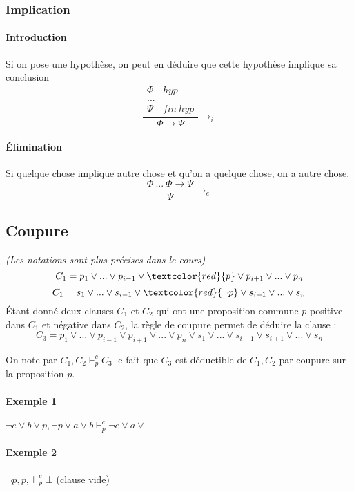 \documentclass[a4paper]{article}
\begin{document}
  \subsubsection{Implication}
  \paragraph{Introduction} Si on pose une hypothèse, on peut en déduire que cette
  hypothèse implique sa conclusion
  $$ \frac{\begin{matrix} \Phi & hyp\\
     ... & \\
     \Psi & fin~hyp\end{matrix}}{\Phi \rightarrow \Psi}\rightarrow_{i} $$

  \paragraph{\'Elimination} Si quelque chose implique autre chose et qu'on a
  quelque chose, on a autre chose.
  $$ \frac{\Phi ~...~ \Phi \rightarrow \Psi}{\Psi}\rightarrow_{e} $$

  \subsection{Coupure}
  \textit{(Les notations sont plus précises dans le cours)}\\
  $$ C_1 = p_1 \lor ... \lor p_{i-1} \lor \textcolor{red}{p} \lor p_{i+1} \lor ... \lor p_n$$
  $$ C_1 = s_1 \lor ... \lor s_{i-1} \lor \textcolor{red}{\lnot p} \lor s_{i+1} \lor ... \lor s_n$$
  \'Etant donné deux clauses $C_1$ et $C_2$ qui ont une proposition commune $p$
  positive dans $C_1$ et négative dans $C_2$, la règle de coupure permet de déduire
  la clause : 
  $$ C_3 = p_1 \lor ... \lor p_{i-1} \lor p_{i+1} \lor ... \lor p_n
     \lor s_1 \lor ... \lor s_{i-1} \lor s_{i+1} \lor ... \lor s_n$$

  On note par $C_1, C_2 \vdash^c_p C_3$ le fait que $C_3$ est déductible de 
  $C_1, C_2$ par coupure sur la proposition $p$.

  \paragraph{Exemple 1} $ \lnot e \lor b \lor p, \lnot p \lor a \lor b \vdash^c_p \lnot e \lor a \lor $
  \paragraph{Exemple 2} $ \lnot p, p, \vdash^c_p \bot $ (clause vide)
\end{document}
